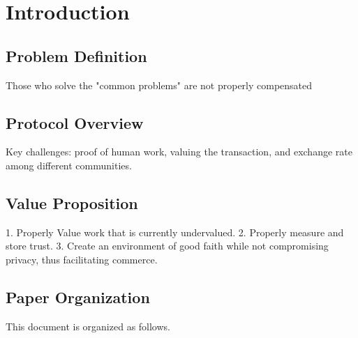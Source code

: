 \section{\textbf{Introduction}}

\subsection{Problem Definition}

Those who solve the "common problems" are not properly compensated

\subsection{Protocol Overview}

Key challenges: proof of human work, valuing the transaction, and exchange rate among different communities.

\subsection{Value Proposition}

1. Properly Value work that is currently undervalued. 2. Properly measure and store trust. 3. Create an environment of good faith while not compromising privacy, thus facilitating commerce. 

\subsection{Paper Organization}

This document is organized as follows.

\newpage
\newpage